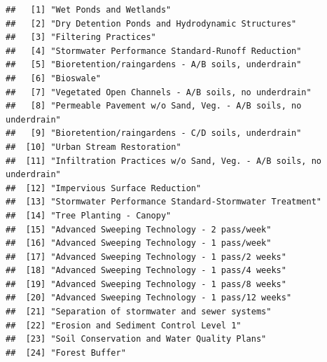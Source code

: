 \documentclass[
]{article}
\begin{document}
\begin{verbatim}
##   [1] "Wet Ponds and Wetlands"                                                                         
##   [2] "Dry Detention Ponds and Hydrodynamic Structures"                                                
##   [3] "Filtering Practices"                                                                            
##   [4] "Stormwater Performance Standard-Runoff Reduction"                                               
##   [5] "Bioretention/raingardens - A/B soils, underdrain"                                               
##   [6] "Bioswale"                                                                                       
##   [7] "Vegetated Open Channels - A/B soils, no underdrain"                                             
##   [8] "Permeable Pavement w/o Sand, Veg. - A/B soils, no underdrain"                                   
##   [9] "Bioretention/raingardens - C/D soils, underdrain"                                               
##  [10] "Urban Stream Restoration"                                                                       
##  [11] "Infiltration Practices w/o Sand, Veg. - A/B soils, no underdrain"                               
##  [12] "Impervious Surface Reduction"                                                                   
##  [13] "Stormwater Performance Standard-Stormwater Treatment"                                           
##  [14] "Tree Planting - Canopy"                                                                         
##  [15] "Advanced Sweeping Technology - 2 pass/week"                                                     
##  [16] "Advanced Sweeping Technology - 1 pass/week"                                                     
##  [17] "Advanced Sweeping Technology - 1 pass/2 weeks"                                                  
##  [18] "Advanced Sweeping Technology - 1 pass/4 weeks"                                                  
##  [19] "Advanced Sweeping Technology - 1 pass/8 weeks"                                                  
##  [20] "Advanced Sweeping Technology - 1 pass/12 weeks"                                                 
##  [21] "Separation of stormwater and sewer systems"                                                     
##  [22] "Erosion and Sediment Control Level 1"                                                           
##  [23] "Soil Conservation and Water Quality Plans"                                                      
##  [24] "Forest Buffer"                                                                                  

\end{verbatim}
\end{document}
